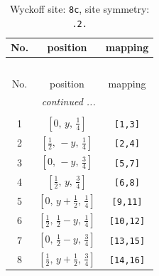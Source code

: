 \documentclass[fleqn,8pt]{jsarticle}
\begin{document}
\begin{longtable}{ccc}
\caption{Wyckoff site: {\tt 8c}, site symmetry: {\tt .2.}}
 \\
 \hline \hline
No. & position & mapping \\ \hline \endfirsthead

\multicolumn{2}{l}{\tablename\ \thetable{}} \\
 \hline \hline
No. & position & mapping \\ \hline \endhead

 \hline \hline
\multicolumn{2}{r}{\footnotesize\it continued ...} \\ \endfoot

 \hline \hline
\multicolumn{2}{r}{} \\ \endlastfoot

1 & $\left[ 0,\, y,\, \frac{1}{4} \right]$ & {\tt [1,3]} \\ \hline
2 & $\left[ \frac{1}{2},\, - y,\, \frac{1}{4} \right]$ & {\tt [2,4]} \\ \hline
3 & $\left[ 0,\, - y,\, \frac{3}{4} \right]$ & {\tt [5,7]} \\ \hline
4 & $\left[ \frac{1}{2},\, y,\, \frac{3}{4} \right]$ & {\tt [6,8]} \\ \hline
5 & $\left[ 0,\, y + \frac{1}{2},\, \frac{1}{4} \right]$ & {\tt [9,11]} \\ \hline
6 & $\left[ \frac{1}{2},\, \frac{1}{2} - y,\, \frac{1}{4} \right]$ & {\tt [10,12]} \\ \hline
7 & $\left[ 0,\, \frac{1}{2} - y,\, \frac{3}{4} \right]$ & {\tt [13,15]} \\ \hline
8 & $\left[ \frac{1}{2},\, y + \frac{1}{2},\, \frac{3}{4} \right]$ & {\tt [14,16]} \\
\end{longtable}
\renewcommand{\arraystretch}{1.2}
\end{document}
